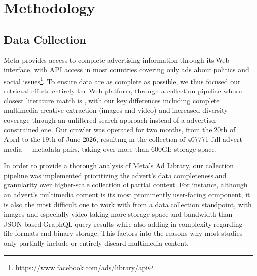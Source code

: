 
\section{Methodology}

\subsection{Data Collection}
Meta provides access to complete advertising information through its Web interface, with API access in most countries covering only ads about politics and social issues\footnote{https://www.facebook.com/ads/library/api}. To ensure data are as complete as possible, we thus focused our retrieval efforts entirely the Web platform, through a collection pipeline whose closest literature match is \cite{metaAudit}, with our key differences including complete multimedia creative extraction (images and video) and increased diversity coverage through an unfiltered search approach instead of a advertiser-constrained one. Our crawler was operated for two months, from the 20th of April to the 19th of June 2026, resulting in the collection of 407771 full advert media + metadata pairs, taking over more than 600GB storage space. 

In order to provide a thorough analysis of Meta's Ad Library, our collection pipeline was implemented prioritizing the advert's data completeness and granularity over higher-scale collection of partial content. 
For instance, although an advert's multimedia content is its most prominently user-facing component, it is also the most difficult one to work with from a data collection standpoint, with images and especially video taking more storage space and bandwidth than JSON-based GraphQL query results while also adding in complexity regarding file formats and binary storage. This factors into the reasons why most studies only partially include or entirely discard multimedia content. 

